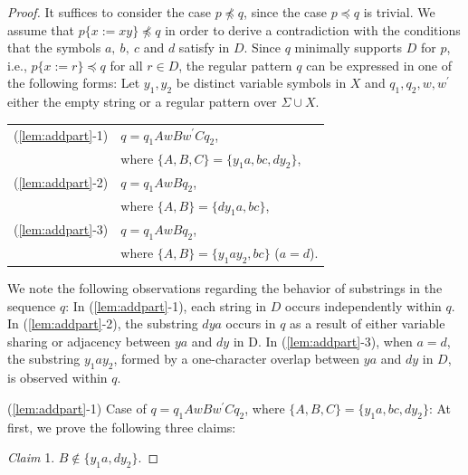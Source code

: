   \begin{proof}
  {\color{black} It suffices to consider the case $p\not\preceq q$, since the case $p\preceq q$ is trivial.}
  We assume that 
  $p \{ x := xy \} \not\preceq q$
  in order to derive a contradiction
  {\color{black} with the conditions that the symbols $a,~b,~c$ and $d$ satisfy in $D$.}
{\color{black} Since 
$q$ minimally supports $D$ for $p$, i.e., $p \{ x := r \} \preceq q$ for all $r \in D$,
the regular pattern }
$q$ can be expressed in one of the following forms: Let $y_{1}, y_{2}$ be distinct variable symbols in $X$ and $q_{1}, q_{2}, w, w^{\prime}$ either the empty string or a regular pattern {\color{black}over} $\Sigma\cup X$.

\smallskip

  \begin{tabular}{ll}
  (\ref{lem:addpart}-1) & $q=q_{1}AwBw^{\prime}Cq_{2}$,\\
  & where $\{ A,B,C \} = \{ y_{1}a,bc,dy_{2} \}$,\\
  (\ref{lem:addpart}-2) & $q=q_{1}AwBq_{2}$,\\
  & where $\{ A,B \} = \{ dy_{1}a,bc \}$,\\
  (\ref{lem:addpart}-3) & $q=q_{1}AwBq_{2}$,\\
  & where $\{ A,B \} = \{ y_{1}ay_{2},bc \}$ ($a = d$).
  \end{tabular}
 
  \noindent
  {\color{black}
  We note the following observations regarding the behavior of substrings in the sequence $q$:
In (\ref{lem:addpart}-1), each string in $D$ occurs independently within $q$.
In (\ref{lem:addpart}-2), the substring $dya$ occurs in $q$ as a result of either variable sharing or adjacency between  $ya$ and $dy$ in D.
In (\ref{lem:addpart}-3), when $a = d$, the substring $y_1ay_2$, formed by a one-character overlap between $ya$ and $dy$ in $D$, is observed within $q$.
  }

  \smallskip

  \noindent
  (\ref{lem:addpart}-1) Case of $q=q_{1}AwBw^{\prime}Cq_{2}$, where $\{ A,B,C \} = \{ y_{1}a,bc,dy_{2} \}$:
  At first, we prove the following three claims:

  \smallskip

  \noindent
  \textit{Claim} 1. $B \not\in \{y_{1}a, dy_{2}\}$.


\end{proof}
